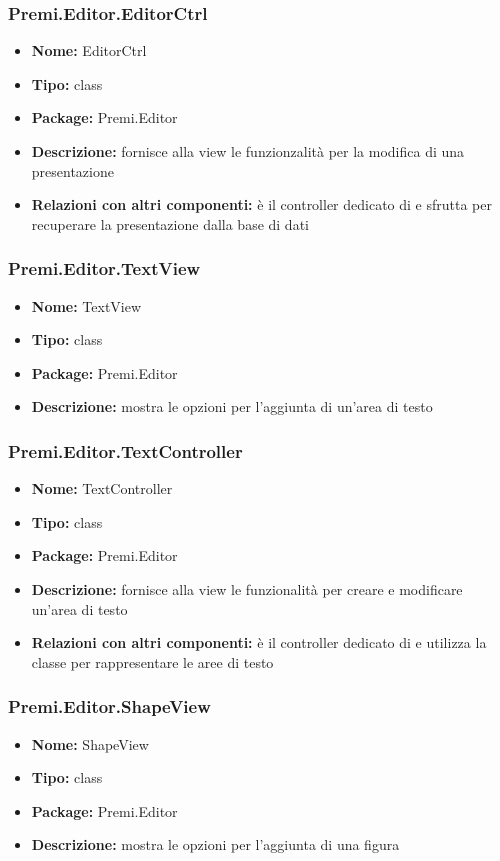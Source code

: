 \subsubsection{Premi.Editor.EditorCtrl}
\begin{itemize}
  \item \textbf{Nome:} EditorCtrl
  \item \textbf{Tipo:} class
  \item \textbf{Package:} Premi.Editor
  \item \textbf{Descrizione:} fornisce alla view le funzionzalità per la modifica di una presentazione
  \item \textbf{Relazioni con altri componenti:} è il controller dedicato di   e sfrutta  per recuperare la presentazione dalla base di dati
\end{itemize}
\subsubsection{Premi.Editor.TextView}
\begin{itemize}
  \item \textbf{Nome:} TextView
  \item \textbf{Tipo:} class
  \item \textbf{Package:} Premi.Editor
  \item \textbf{Descrizione:} mostra le opzioni per l'aggiunta di un'area di testo
\end{itemize}
\subsubsection{Premi.Editor.TextController}
\begin{itemize}
  \item \textbf{Nome:} TextController
  \item \textbf{Tipo:} class
  \item \textbf{Package:} Premi.Editor
  \item \textbf{Descrizione:} fornisce alla view le funzionalità per creare e modificare un'area di testo
  \item \textbf{Relazioni con altri componenti:} è il controller dedicato di   e utilizza la classe  per rappresentare le aree di testo
\end{itemize}
\subsubsection{Premi.Editor.ShapeView}
\begin{itemize}
  \item \textbf{Nome:} ShapeView
  \item \textbf{Tipo:} class
  \item \textbf{Package:} Premi.Editor
  \item \textbf{Descrizione:} mostra le opzioni per l'aggiunta di una figura
\end{itemize}
